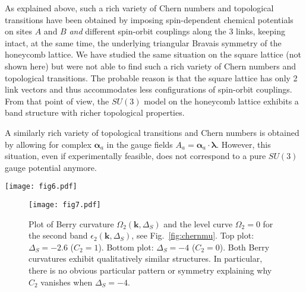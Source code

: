 \documentclass[aps,pra,showpacs,twocolumn,superscriptaddress]{revtex4-1}
\begin{document}
As explained above, such a rich variety of Chern numbers and topological 
transitions have been obtained by imposing spin-dependent chemical potentials 
on sites $A$ and $B$ \textit{and} different  spin-orbit couplings along the 3 links, 
keeping intact, at the same time, the underlying triangular Bravais symmetry of 
the honeycomb lattice. We have studied the same situation on the square lattice 
(not shown here) but were not able to find such a rich variety of Chern numbers 
and topological transitions. The probable reason is that the square lattice 
has only 2 link vectors and thus accommodates less configurations of spin-orbit couplings.  
From that point of view, the $SU(3)$ model on the honeycomb lattice exhibits a 
band structure with richer topological properties. 
        
A similarly rich variety of topological transitions and Chern numbers is obtained 
by allowing for complex $\bm{\alpha}_a$ in the gauge fields 
$A_a= \bm{\alpha}_a \cdot \bm{\lambda}$. However, this situation, even if 
experimentally feasible, does not correspond to a pure $SU(3)$ gauge potential anymore.  
        
\begin{figure*}[t!p]
\centerline{\texttt{[image: fig6.pdf]}}
\caption{\label{fig:chernmu} Chern numbers $C_n$ and band 
gaps $g_{n+1,n} = \mathrm{Min} \left[\epsilon_{n+1}(\mathbf{k}, \Delta_S)-\epsilon_n(\mathbf{k}, \Delta_S)\right]$ as
functions of the spin-dependent mass imbalance $\Delta_S$. Many topological transitions are
observed, resulting in various integer changes of the Chern number values, 
which are no longer restricted to $\pm(3,-6,3)$ (see text). The red-dotted vertical lines 
are guides to the eye emphasizing that
a change in Chern numbers is always associated with a vanishing gap between two bands. 
Due to a symmetry of the Hamiltonian, we have $C_{7-n}(\Delta_S)=C_{n}(-\Delta_S)$, see text. 
For $\Delta_S=0$, one recovers the expected set of Chern numbers $(-3,6,-3)$. }
\end{figure*}

\begin{figure}[t!p]
 
 \centerline{\texttt{[image: fig7.pdf]}}


\caption{\label{fig:berrycurvature} Plot of Berry curvature $\Omega_2(\mathbf{k}, \Delta_S)$ 
and the level curve $\Omega_2=0$ for the second band $\epsilon_2(\mathbf{k}, \Delta_S)$, 
see Fig.~\ref{fig:chernmu}. Top plot: $\Delta_S=-2.6$ ($C_2 = 1$). Bottom plot: $\Delta_S=-4$ ($C_2=0$). 
Both Berry curvatures exhibit qualitatively similar structures. 
In particular, there is no obvious particular pattern or symmetry explaining why $C_2$ 
vanishes when $\Delta_S=-4$. }
\end{figure}
\end{document}
